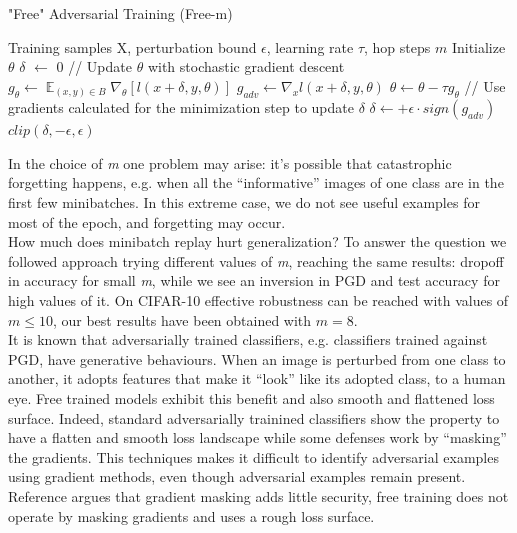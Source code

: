 \documentclass{article}
\DeclareMathOperator{\EX}{\mathbb{E}}%
\begin{document}
\begin{algorithm}[H]
	\caption{"Free" Adversarial Training (Free-m)}
	\begin{algorithmic}[1]
		\Require Training samples X, perturbation bound $\epsilon$, learning rate
		$\tau$, hop steps $m$ \State Initialize $\theta$ \State $\delta$
		$\leftarrow$ 0  
		 \State // Update $\theta$ with stochastic gradient descent
		\State $g_{\theta} \leftarrow \EX_{(x,y) \in B} \nabla_{\theta} [l(x+\delta,
		y, \theta)]$ \State $g_{adv} \leftarrow \nabla_{x} l(x+\delta, y, \theta)$
		\State $\theta \leftarrow \theta - \tau g_{\theta}$ \State // Use gradients
		calculated for the minimization step to update $\delta$ \State $\delta
		\leftarrow + \epsilon \cdot sign(g_{adv})$ \State $clip(\delta, -\epsilon,
		\epsilon)$ \EndFor \EndFor \EndFor
	\end{algorithmic}
\end{algorithm}
In the choice of \textit{m} one problem may arise: it's possible that catastrophic
forgetting happens, e.g. when all the “informative” images of one class are in
the first few minibatches. In this extreme case, we do not see useful examples
for most of the epoch, and forgetting may occur.\\
How much does minibatch replay hurt generalization? To answer the question we followed \cite{ShafahiEtAl2019b}
approach trying different values of \textit{m}, reaching the same results: dropoff in
accuracy for small \textit{m}, while we see an inversion in PGD and test
accuracy for high values of it. On CIFAR-10 effective robustness can be reached
with values of $m \leq 10$, our best results have been obtained with $m = 8$.\\
It is known that adversarially trained classifiers, e.g. classifiers trained
against PGD,  have generative
behaviours. When an image is perturbed from one class to another, it adopts
features that make it “look” like its adopted class, to a human eye. Free
trained models exhibit this benefit and also smooth and flattened loss surface.
Indeed, standard adversarially trainined classifiers show the property to have a
flatten and smooth loss landscape while some defenses work by “masking” the
gradients. This techniques makes it difficult to identify adversarial examples
using gradient methods, even though adversarial examples remain present.
Reference \cite{EngstromEtAl2018} argues that gradient masking adds little
security, free training does not operate by masking gradients and uses a rough
loss surface.
\end{document}
